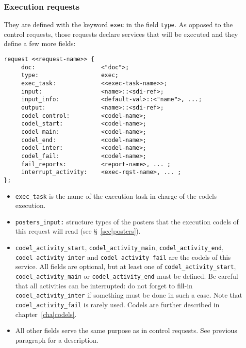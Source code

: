 \subsubsection{Execution requests}

They are defined with the keyword \texttt{exec} in the field \texttt{type}. As
opposed to the control requests, those requests declare services that
will be executed and they define a few more fields:

\begin{center}\begin{cartouche}\small\begin{verbatim}
request <<request-name>> {
     doc:                   <"doc">;
     type:                  exec;
     exec_task:             <<exec-task-name>>;
     input:                 <name>::<sdi-ref>;
     input_info:            <default-val>::<"name">, ...;
     output:                <name>::<sdi-ref>;
     codel_control:         <codel-name>;
     codel_start:           <codel-name>;
     codel_main:            <codel-name>;
     codel_end:             <codel-name>;
     codel_inter:           <codel-name>;
     codel_fail:            <codel-name>;
     fail_reports:          <report-name>, ... ;
     interrupt_activity:    <exec-rqst-name>, ... ;
};
\end{verbatim}\end{cartouche}\end{center}

\begin{itemize}
\item \texttt{exec\_task} is the name of the execution task in charge of the
codels execution.

\item \texttt{posters\_input:} structure types of the posters that the
execution codels of this request will read (see \S~\vref{sec|posters}).

\item \texttt{codel\_activity\_start}, \texttt{codel\_activity\_main}, 
\texttt{codel\_activity\_end},\\ \texttt{codel\_activity\_inter} and  
\texttt{codel\_activity\_fail} are the codels of this service.  All fields are
optional, but at least one of \texttt{codel\_activity\_start}, 
\texttt{codel\_activity\_main} or \texttt{codel\_activity\_end} must be defined.
Be careful that all activities can be interrupted: do not forget to
fill-in \texttt{codel\_activity\_inter} if something must be done in such a
case.
Note that \texttt{codel\_activity\_fail} is rarely used.
Codels are further described in chapter~\ref{cha|codels}.


\item All other fields serve the same purpose  as in control  requests.
See previous paragraph for a description.

\end{itemize}


